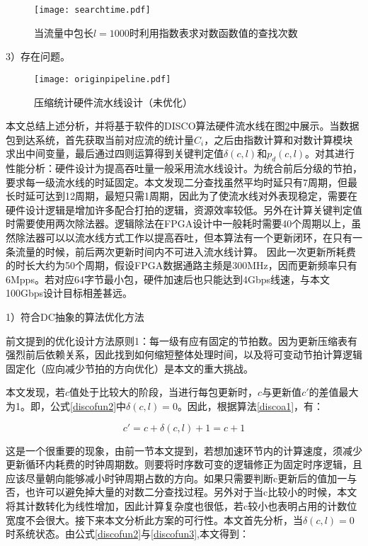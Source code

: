 \begin{figure}[!ht]
	\centering
	\texttt{[image: searchtime.pdf]}
	\caption{当流量中包长$l=1000$时利用指数表求对数函数值的查找次数} \label{fig:searchtime}
\end{figure}



3）存在问题。

\begin{figure}[!ht]
	\centering
	\texttt{[image: originpipeline.pdf]}
	\caption{压缩统计硬件流水线设计（未优化）} \label{fig:originpipeline}
\end{figure}

本文总结上述分析，并将基于软件的DISCO算法硬件流水线在图\ref{fig:originpipeline}中展示。当数据包到达系统，首先获取当前对应流的统计量$ C_i $，之后由指数计算和对数计算模块求出中间变量，最后通过四则运算得到关键判定值$ \delta(c,l)$和$p_d(c,l) $。对其进行性能分析：硬件设计为提高吞吐量一般采用流水线设计。为统合前后分级的节拍，要求每一级流水线的时延固定。本文发现二分查找虽然平均时延只有7周期，但最长时延可达到12周期，最短只需1周期，因此为了使流水线对外表现稳定，需要在硬件设计逻辑是增加许多配合打拍的逻辑，资源效率较低。另外在计算关键判定值时需要使用两次除法器。逻辑除法在FPGA设计中一般耗时需要40个周期以上，虽然除法器可以以流水线方式工作以提高吞吐，但本算法有一个更新闭环，在只有一条流量的时候，前后两次更新时间内不可进入流水线计算。
因此一次更新所耗费的时长大约为50个周期，假设FPGA数据通路主频是300MHz，因而更新频率只有6Mpps。若对应64字节最小包，硬件加速后也只能达到4Gbps线速，与本文100Gbps设计目标相差甚远。


1）符合DC抽象的算法优化方法

前文提到的优化设计方法原则1：每一级有应有固定的节拍数。因为更新压缩表有强烈前后依赖关系，因此找到如何缩短整体处理时间，以及将可变动节拍计算逻辑固定化（应向减少节拍的方向优化）是本文的重大挑战。

本文发现，若$ c $值处于比较大的阶段，当进行每包更新时，$ c $与更新值$ c' $的差值最大为1。即，公式\ref{discofun2}中$ \delta(c,l)=0$。因此，根据算法\ref{discoa1}，有：

\begin{equation} \label{mydiscof1}
c'=c+\delta(c,l) + 1 =c+1
\end{equation}

这是一个很重要的现象，由前一节本文提到，若想加速环节内的计算速度，须减少更新循环内耗费的时钟周期数。则要将时序数可变的逻辑修正为固定时序逻辑，且应该尽量朝向能够减小时钟周期占数的方向。如果只需要判断c更新后的值加一与否，也许可以避免掉大量的对数二分查找过程。另外对于当c比较小的时候，本文将其计数转化为线性增加，因此计算复杂度也很低，若c较小也表明占用的计数位宽度不会很大。接下来本文分析此方案的可行性。本文首先分析，当$ \delta(c,l)=0$时系统状态。由公式\ref{discofun2}与\ref{discofun3},本文得到：

